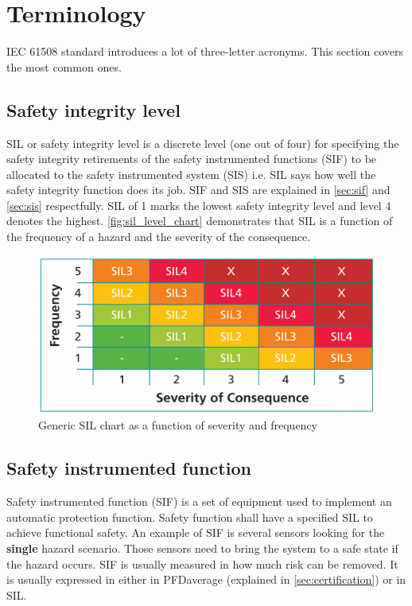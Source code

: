 \section{Terminology}

IEC 61508 standard introduces a lot of three-letter acronyms. This section covers the most common ones.

\subsection{Safety integrity level}

SIL or safety integrity level is a discrete level (one out of four) for specifying the safety integrity retirements of the safety instrumented functions (SIF) to be allocated to the safety instrumented system (SIS) i.e. SIL says how well the safety integrity function does its job. SIF and SIS are explained in \autoref{sec:sif}  and \autoref{sec:sis} respectfully. SIL of 1 marks the lowest safety integrity level and level 4 denotes the highest.  \autoref{fig:sil_level_chart} demonstrates that SIL is a function of the frequency of a hazard and the severity of the consequence. 


\begin{figure}[H]

      \centering
      \includegraphics[width=0.7\linewidth]{images/sil_level_chart.png}
      \caption{Generic SIL chart as a function of severity and frequency}
      \label{fig:sil_level_chart}
    
\end{figure}

\subsection{Safety instrumented function}
\label{sec:sif}

Safety instrumented function (SIF) is a set of equipment used to implement an automatic protection function. Safety function shall have a specified SIL to achieve functional safety. 
An example of SIF is several sensors looking for the \textbf{single} hazard scenario. Those sensors need to bring the system to a safe state if the hazard occurs. SIF is usually measured in how much risk can be removed. It is usually expressed in either in PFDaverage (explained in \autoref{sec:certification}) or in SIL. 

